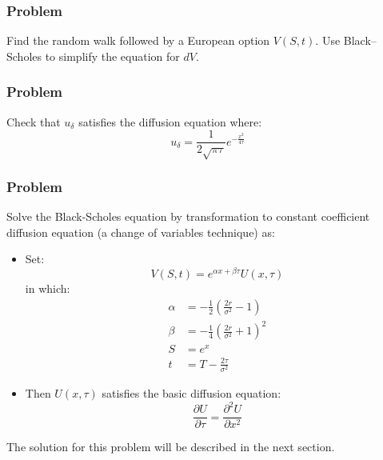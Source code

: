 \subsubsection{Problem}
Find the random walk followed by a European option $V(S, t)$. Use Black–Scholes to simplify the equation for $dV$.


\subsubsection{Problem}
Check that $u_\delta$ satisfies the diffusion equation where:
\begin{equation}
    u_\delta = \frac{1}{2\sqrt{\pi \tau}} e^{-\frac{x^2}{4 \tau}}
\end{equation}


\subsubsection{Problem}
Solve the Black-Scholes equation by transformation to constant coefficient diffusion equation (a change of variables technique) as:
\begin{itemize}
    \setlength\itemsep{0em}
    \item Set:
    \begin{equation}
        V(S,t) = e^{\alpha x + \beta \tau} U(x,\tau)
    \end{equation}
    in which:
    \begin{align*}
        \alpha &= -\frac{1}{2} \left( \frac{2r}{\sigma^2} - 1 \right)   \\
        \beta  &= -\frac{1}{4} \left( \frac{2r}{\sigma^2} + 1 \right)^2 \\
        S      &= e^{x}                                                 \\
        t      &= T - \frac{2\tau}{\sigma^2}
    \end{align*}
    \item Then $U(x,\tau)$ satisfies the basic diffusion equation:
    \begin{equation}
        \frac{\partial U}{\partial \tau} = \frac{\partial^2 U}{\partial x^2}
    \end{equation}
\end{itemize}
The solution for this problem will be described in the next section. 


